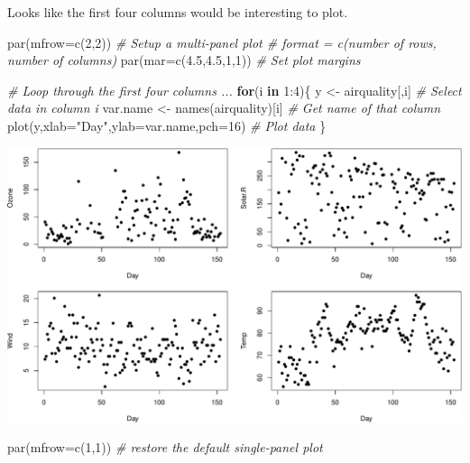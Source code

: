 \documentclass[
]{book}
\newenvironment{Shaded}{\begin{snugshade}}{\end{snugshade}}
\newcommand{\AttributeTok}[1]{\textcolor[rgb]{0.77,0.63,0.00}{#1}}
\newcommand{\CommentTok}[1]{\textcolor[rgb]{0.56,0.35,0.01}{\textit{#1}}}
\newcommand{\ControlFlowTok}[1]{\textcolor[rgb]{0.13,0.29,0.53}{\textbf{#1}}}
\newcommand{\DecValTok}[1]{\textcolor[rgb]{0.00,0.00,0.81}{#1}}
\newcommand{\FloatTok}[1]{\textcolor[rgb]{0.00,0.00,0.81}{#1}}
\newcommand{\FunctionTok}[1]{\textcolor[rgb]{0.00,0.00,0.00}{#1}}
\newcommand{\NormalTok}[1]{#1}
\newcommand{\OtherTok}[1]{\textcolor[rgb]{0.56,0.35,0.01}{#1}}
\newcommand{\SpecialCharTok}[1]{\textcolor[rgb]{0.00,0.00,0.00}{#1}}
\newcommand{\StringTok}[1]{\textcolor[rgb]{0.31,0.60,0.02}{#1}}
\begin{document}
Looks like the first four columns would be interesting to plot.

\begin{Shaded}
\begin{Highlighting}[]
\FunctionTok{par}\NormalTok{(}\AttributeTok{mfrow=}\FunctionTok{c}\NormalTok{(}\DecValTok{2}\NormalTok{,}\DecValTok{2}\NormalTok{)) }\CommentTok{\# Setup a multi{-}panel plot \# format = c(number of rows, number of columns)}
\FunctionTok{par}\NormalTok{(}\AttributeTok{mar=}\FunctionTok{c}\NormalTok{(}\FloatTok{4.5}\NormalTok{,}\FloatTok{4.5}\NormalTok{,}\DecValTok{1}\NormalTok{,}\DecValTok{1}\NormalTok{)) }\CommentTok{\# Set plot margins}

\CommentTok{\# Loop through the first four columns ...}
\ControlFlowTok{for}\NormalTok{(i }\ControlFlowTok{in} \DecValTok{1}\SpecialCharTok{:}\DecValTok{4}\NormalTok{)\{}
\NormalTok{  y }\OtherTok{\textless{}{-}}\NormalTok{ airquality[,i] }\CommentTok{\# Select data in column i}
\NormalTok{  var.name }\OtherTok{\textless{}{-}} \FunctionTok{names}\NormalTok{(airquality)[i] }\CommentTok{\# Get name of that column}
  \FunctionTok{plot}\NormalTok{(y,}\AttributeTok{xlab=}\StringTok{"Day"}\NormalTok{,}\AttributeTok{ylab=}\NormalTok{var.name,}\AttributeTok{pch=}\DecValTok{16}\NormalTok{) }\CommentTok{\# Plot data}
\NormalTok{\}}
\end{Highlighting}
\end{Shaded}

\includegraphics{figures/unnamed-chunk-306-1.pdf}

\begin{Shaded}
\begin{Highlighting}[]

\FunctionTok{par}\NormalTok{(}\AttributeTok{mfrow=}\FunctionTok{c}\NormalTok{(}\DecValTok{1}\NormalTok{,}\DecValTok{1}\NormalTok{)) }\CommentTok{\# restore the default single{-}panel plot}
\end{Highlighting}
\end{Shaded}
\end{document}
